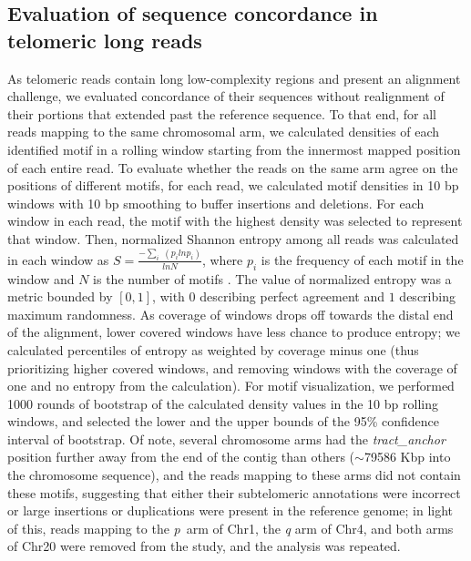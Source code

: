 \documentclass{article}
\begin{document}
\subsection*{Evaluation of sequence concordance in telomeric long reads}
    As telomeric reads contain long low-complexity regions and present an alignment challenge,
        we evaluated concordance of their sequences without realignment of their portions that extended past the reference sequence.
    To that end, for all reads mapping to the same chromosomal arm,
        we calculated densities of each identified motif in a rolling window starting from the innermost mapped position of each entire read.
    To evaluate whether the reads on the same arm agree on the positions of different motifs,
        for each read, we calculated motif densities in 10 bp windows with 10 bp smoothing to buffer insertions and deletions.
    For each window in each read,
        the motif with the highest density was selected to represent that window.
    Then, normalized Shannon entropy among all reads was calculated in each window as $ S = \frac{ - \sum_{i} \; ( p_{i} ln p_{i} )}{ln N} $,
        where $ p_{i} $ is the frequency of each motif in the window and $ N $ is the number of motifs \parencite{hepc_entropy}.
    The value of normalized entropy was a metric bounded by $ [ 0, 1 ] $,
        with $ 0 $ describing perfect agreement and $ 1 $ describing maximum randomness.
    As coverage of windows drops off towards the distal end of the alignment,
        lower covered windows have less chance to produce entropy;
        we calculated percentiles of entropy as weighted by coverage minus one
        (thus prioritizing higher covered windows, and removing windows with the coverage of one and no entropy from the calculation).
    For motif visualization,
        we performed 1000 rounds of bootstrap of the calculated density values in the 10 bp rolling windows,
            and selected the lower and the upper bounds of the 95\% confidence interval of bootstrap.
    Of note, several chromosome arms had the \textit{tract\_anchor} position further away from the end of the contig than others
            ($\sim$79\textendash{}586 Kbp into the chromosome sequence),
        and the reads mapping to these arms did not contain these motifs,
        suggesting that
            either their subtelomeric annotations were incorrect
            or large insertions or duplications were present in the reference genome;
        in light of this, reads mapping to
            the \mbox{\textit{p} arm} of Chr1,
            the \textit{q} arm of Chr4,
            and both arms of Chr20
        were removed from the study,
        and the analysis was repeated.
\end{document}

